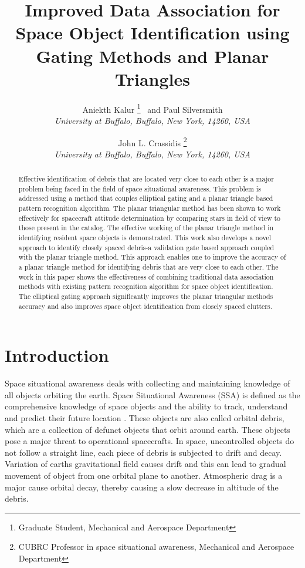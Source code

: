 \documentclass[]{aiaa-tc}%
\title{Improved Data Association for Space Object Identification using Gating Methods and Planar Triangles}
\author{
  Aniekth Kalur%
    \thanks{Graduate Student, Mechanical and Aerospace Department}
  \ and Paul Silversmith\thanksibid{1}\\
  {\normalsize\itshape
   University at Buffalo, Buffalo, New York, 14260, USA}\\
  \and
  John L. Crassidis%
   \thanks{CUBRC Professor in space situational awareness, Mechanical and Aerospace Department}\\
  {\normalsize\itshape
  University at Buffalo, Buffalo, New York, 14260, USA}
 }
\begin{document}
\maketitle

\begin{abstract}
Effective identification of debris that are located very close to each other is a major problem being faced in the field of space situational awareness. This problem is addressed using a method that couples elliptical gating and a planar triangle based pattern recognition algorithm. The planar triangular method has been shown to work effectively for spacecraft attitude determination by comparing stars in field of view to those present in the catalog. The effective working of the planar triangle method in identifying resident space objects is demonstrated. This work also develops a novel approach to identify closely spaced debris-a validation gate based approach  coupled with the planar triangle method. This approach enables one to improve the accuracy of a planar triangle method for identifying debris that are very close to each other. The work in this paper shows the effectiveness of combining traditional data association methods with existing pattern recognition algorithm for space object identification. The elliptical gating approach significantly improves the planar triangular methods accuracy and also improves space object identification from closely spaced clutters.
\end{abstract}


\section{Introduction}

Space situational awareness deals with collecting and maintaining knowledge of all objects orbiting the earth. Space Situational Awareness (SSA) is defined
as the comprehensive knowledge of space objects and the ability to track, understand and predict their future location \cite{becker_space_2015}. These objects are also called orbital debris, which are a collection of defunct objects that orbit around earth. These objects pose a major threat to operational spacecrafts. In space, uncontrolled objects do not follow a straight line, each piece of debris is subjected to drift and decay. Variation of earths gravitational field causes drift and this can lead to gradual movement of object from one orbital plane to another. Atmospheric drag is a major cause orbital decay, thereby causing a slow decrease in altitude of the debris. \\
\end{document}
